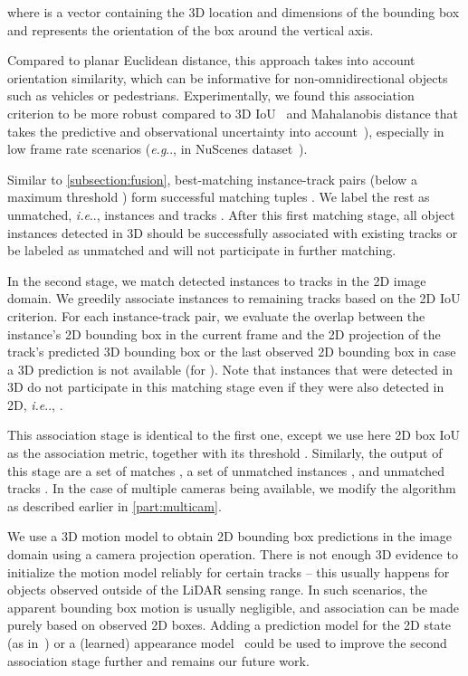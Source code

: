 \documentclass[letterpaper, 10 pt, conference]{ieeeconf}
\makeatletter
\DeclareRobustCommand\onedot{\futurelet\@let@token\@onedot}
\def\@onedot{\ifx\@let@token.\else.\null\fi\xspace}
\def\eg{\emph{e.g}\onedot} \def\Eg{\emph{E.g}\onedot}
\def\ie{\emph{i.e}\onedot} \def\Ie{\emph{I.e}\onedot}
\newcommand{\PAR}[1]{\vskip4pt \noindent {\bf #1~}}
\makeatother
\begin{document}
where  is a vector containing the 3D location and dimensions of the bounding box and  represents the orientation of the box around the vertical axis. 

Compared to planar Euclidean distance, this approach takes into account orientation similarity, which can be informative for non-omnidirectional objects such as vehicles or pedestrians. 
Experimentally, we found this association criterion to be more robust compared to 3D IoU~\cite{Weng2020_AB3DMOT} and Mahalanobis distance that takes the predictive and observational uncertainty into account~\cite{chiu2020probabilistic}), especially in low frame rate scenarios (\eg, in NuScenes dataset~\cite{nuscenes2019}). 


Similar to {\subsectionautorefname} {\ref{subsection:fusion}}, best-matching instance-track pairs (below a maximum threshold ) form successful matching tuples . 
We label the rest as unmatched, \ie, instances  and tracks . After this first matching stage, all object instances detected in 3D should be successfully associated with existing tracks or be labeled as unmatched and will not participate in further matching. 


\PAR{Second stage data association.} In the second stage, we match detected instances to tracks in the 2D image domain. 
We greedily associate instances {} to remaining tracks {  } based on the 2D IoU criterion. For each instance-track pair, we evaluate the overlap between the instance's 2D bounding box in the current frame and the 2D projection of the track's predicted 3D bounding box or the last observed 2D bounding box in case a 3D prediction is not available (for ). Note that instances that were detected in 3D do not participate in this matching stage even if they were also detected in 2D, \ie, .

This association stage is identical to the first one, except we use here 2D box IoU as the association metric, together with its threshold . 
Similarly, the output of this stage are a set of matches , a set of unmatched instances , and unmatched tracks . 
In the case of multiple cameras being available, we modify the algorithm as described earlier in {\partautorefname} {\ref{part:multicam}}.

We use a 3D motion model to obtain 2D bounding box predictions in the image domain using a camera projection operation. 
There is not enough 3D evidence to initialize the motion model reliably for certain tracks -- this usually happens for objects observed outside of the LiDAR sensing range. In such scenarios, the apparent bounding box motion is usually negligible, and association can be made purely based on observed 2D boxes. 
Adding a prediction model for the 2D state (as in~\cite{Osep17ICRA, weng20cvpr}) or a (learned) appearance model~\cite{LealTaixe16CVPRW, Voigtlaender19CVPR} could be used to improve the second association stage further and remains our future work. 
\end{document}
